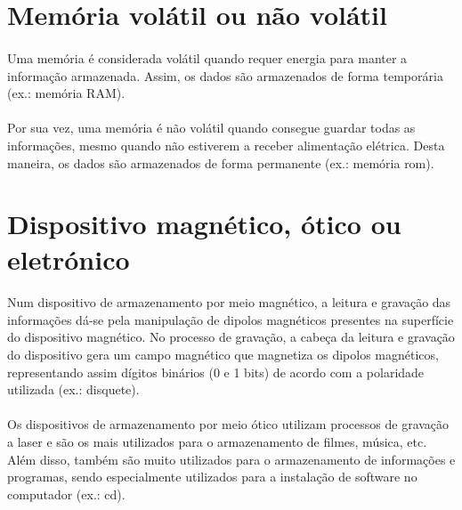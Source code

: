 \documentclass[a4paper]{report}
\begin{document}
\section{Memória volátil ou não volátil}
\label{sect.memoriavolnvol}

\paragraph*{}Uma memória é considerada volátil quando requer energia para manter a informação armazenada. Assim, os dados são armazenados de forma temporária (ex.: memória RAM).

\paragraph*{}Por sua vez, uma memória é não volátil quando consegue guardar todas as informações, mesmo quando não estiverem a receber alimentação elétrica. Desta maneira, os dados são armazenados de forma permanente (ex.: memória \ac{rom}).

\newpage

\section{Dispositivo magnético, ótico ou eletrónico}
\label{sect.dispmagoticeletr}

\paragraph*{}Num dispositivo de armazenamento por meio magnético, a leitura e gravação das informações dá-se pela manipulação de dipolos magnéticos presentes na superfície do dispositivo magnético. No processo de gravação, a cabeça da leitura e gravação do dispositivo gera um campo magnético que magnetiza os dipolos magnéticos, representando assim dígitos binários (0 e 1 bits) de acordo com a polaridade utilizada (ex.: disquete). 

\paragraph*{}Os dispositivos de armazenamento por meio ótico utilizam processos de gravação a laser e são os mais utilizados para o armazenamento de filmes, música, etc. Além disso, também são muito utilizados para o armazenamento de informações e programas, sendo especialmente utilizados para a instalação de software no computador (ex.: \ac{cd}).
\end{document}
